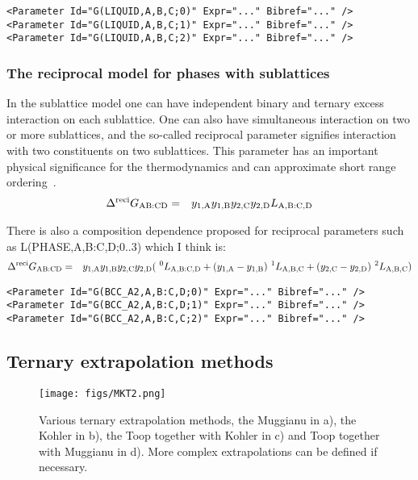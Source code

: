 \documentclass{article}
\begin{document}
\begin{appendices}
\begin{verbatim}
<Parameter Id="G(LIQUID,A,B,C;0)" Expr="..." Bibref="..." />
<Parameter Id="G(LIQUID,A,B,C;1)" Expr="..." Bibref="..." />
<Parameter Id="G(LIQUID,A,B,C;2)" Expr="..." Bibref="..." />
\end{verbatim}

\subsubsection{The reciprocal model for phases with sublattices}\label{sec:recip}

In the sublattice model one can have independent binary and ternary
excess interaction on each sublattice.  One can also have simultaneous
interaction on two or more sublattices, and the so-called reciprocal
parameter signifies interaction with two constituents on two
sublattices.  This parameter has an important physical significance
for the thermodynamics and can approximate short range
ordering~\cite{98Sun}.
\begin{eqnarray}
\Delta ^{\rm reci}G_{\rm AB:CD} &=& y_{1,\rm A} y_{1,\rm B} y_{2,\rm C} y_{2,\rm D} L_{\rm A,B:C,D}
\end{eqnarray}

There is also a composition dependence proposed for reciprocal
parameters such as L(PHASE,A,B:C,D;0..3) which I think is:
\begin{eqnarray}
\Delta  ^{\rm reci}G_{\rm AB:CD} &=& y_{1,\rm A}y_{1,\rm B}y_{2,\rm C}y_{2,\rm D} (~^0L_{\rm A,B:C,D} +  (y_{1,\rm A}-y_{1,\rm B})~^1L_{\rm A,B,C} + (y_{2,\rm C}-y_{2,\rm D})~^2L_{\rm A,B,C})  \label{eq:hillert4}
\end{eqnarray}

\begin{verbatim}
<Parameter Id="G(BCC_A2,A,B:C,D;0)" Expr="..." Bibref="..." />
<Parameter Id="G(BCC_A2,A,B:C,D;1)" Expr="..." Bibref="..." />
<Parameter Id="G(BCC_A2,A,B:C,C;2)" Expr="..." Bibref="..." />
\end{verbatim}

\subsection{Ternary extrapolation methods}\label{sec:ternaryxpol}

\begin{figure}[!h]
  \texttt{[image: figs/MKT2.png]}
  \caption{Various ternary extrapolation methods, the Muggianu in a),
    the Kohler in b), the Toop together with Kohler in c) and Toop
    together with Muggianu in d).  More complex extrapolations can be
    defined if necessary.}\label{fg:MKT2}
\end{figure}


\end{appendices}
\end{document}
